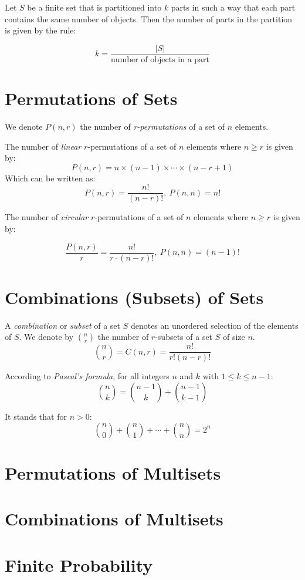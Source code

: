 \documentclass[12pt]{article}
\begin{document}
Let $S$ be a finite set that is partitioned into $k$ parts in such a way that each part contains the same number of objects. Then the number of parts in the partition is given by the rule:

$$
k = \frac{|S|}{\text{number of objects in a part}}
$$

\section{Permutations of Sets}

We denote $P(n, r)$ the number of \textit{r-permutations} of a set of $n$ elements.

The number of \textit{linear} $r$-permutations of a set of $n$ elements where $n \geq r$ is given by:
%
$$
P(n, r) = n \times (n - 1) \times \cdots \times (n - r + 1)
$$
%
Which can be written as:
%
$$
P(n, r) = \frac{n!}{(n - r)!}, \ P(n, n) = n!
$$

The number of \textit{circular} $r$-permutations of a set of $n$ elements where $n \geq r$ is given by:

$$
\frac{P(n, r)}{r} = \frac{n!}{r \cdot (n - r)!}, \ P(n, n) =  (n - 1)!
$$

\section{Combinations (Subsets) of Sets}

A \textit{combination} or \textit{subset} of a set $S$ denotes an unordered selection of the elements of $S$.
%
We denote by $\binom n r$ the number of $r$-subsets of a set $S$ of size $n$.
%
$$
\binom n r = C(n, r) = \frac{n!}{r! (n - r)!}
$$

According to \textit{Pascal's formula}, for all integers $n$ and $k$ with $1 \leq k \leq n - 1$:
%
$$
\binom n k = \binom{n - 1}{k} + \binom{n - 1}{k - 1}
$$

It stands that for $n > 0$:
%
$$
\binom n 0 + \binom n 1 + \cdots + \binom n n = 2^n
$$

\section{Permutations of Multisets}

\section{Combinations of Multisets}

\section{Finite Probability}
\end{document}
